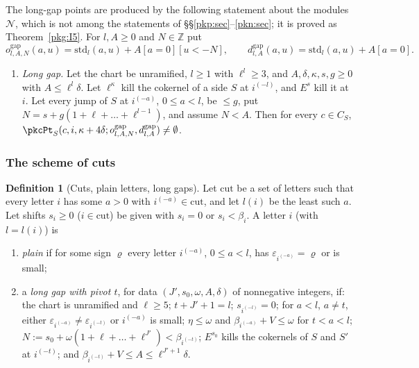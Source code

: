 \documentclass[10pt]{amsart}
\theoremstyle{definition}
\newtheorem{definition}[theorem]{Definition}
\theoremstyle{remark}
\newcommand{\Z}{\mathbb Z}
\begin{document}
The long-gap points are produced by the following statement about the modules $\mathcal N$, which is
not among the statements of \S\S\ref{pkp:sec}--\ref{pkn:sec}; it is proved as Theorem~\ref{pkg:I5}.
For $l,A\ge0$ and $N\in\Z$ put
\[
o^{\mathrm{gap}}_{l,A,N}(a,u)=\mathrm{std}_l(a,u)+A[a=0][u<-N],\qquad
d^{\mathrm{gap}}_{l,A}(a,u)=\mathrm{std}_l(a,u)+A[a=0].
\]

\begin{enumerate}
\item[(I5)] \emph{Long gap.} Let the chart be unramified, $l\ge1$ with $\ell^l\ge3$, and
$A,\delta,\kappa,s,g\ge0$ with $A\le\ell^l\delta$. Let $\ell^\kappa$ kill the cokernel of a side $S$
at $i^{(-l)}$, and $E^s$ kill it at $i$. Let every jump of $S$ at $i^{(-a)}$, $0\le a<l$, be $\le g$,
put $N=s+g(1+\ell+\dots+\ell^{l-1})$, and assume $N<A$. Then for every $c\in C_S$,
$\pkcPt_S(c,i,\kappa+4\delta;o^{\mathrm{gap}}_{l,A,N},d^{\mathrm{gap}}_{l,A})\ne\emptyset$.
\end{enumerate}

\subsubsection{The scheme of cuts}\label{pkd:ss-scheme}

\begin{definition}[Cuts, plain letters, long gaps]\label{pkd:def-cut}
Let $\mathrm{cut}$ be a set of letters such that every letter $i$ has some $a>0$ with
$i^{(-a)}\in\mathrm{cut}$, and let $l(i)$ be the least such $a$. Let shifts $s_i\ge0$ ($i\in\mathrm{cut}$)
be given with $s_i=0$ or $s_i<\beta_i$. A letter $i$ (with $l=l(i)$) is
\begin{enumerate}
\item[(a)] \emph{plain} if for some sign $\varrho$ every letter $i^{(-a)}$, $0\le a<l$, has
$\varepsilon_{i^{(-a)}}=\varrho$ or is small;
\item[(b)] a \emph{long gap with pivot $t$}, for data $(J',s_0,\omega,A,\delta)$ of nonnegative
integers, if: the chart is unramified and $\ell\ge5$; $t+J'+1=l$; $s_{i^{(-l)}}=0$; for $a<l$,
$a\ne t$, either $\varepsilon_{i^{(-a)}}\ne\varepsilon_{i^{(-t)}}$ or $i^{(-a)}$ is small; $\eta\le\omega$
and $\beta_{i^{(-a)}}+V\le\omega$ for $t<a<l$; $N:=s_0+\omega(1+\ell+\dots+\ell^{J'})<\beta_{i^{(-t)}}$;
$E^{s_0}$ kills the cokernels of $S$ and $S'$ at $i^{(-t)}$; and
$\beta_{i^{(-t)}}+V\le A\le\ell^{J'+1}\delta$.
\end{enumerate}
\end{definition}
\end{document}
